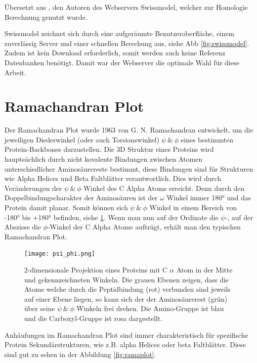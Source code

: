 Übersetzt aus \cite{Biasini.2014}, den Autoren des Webservers Swissmodel, welcher zur Homologie Berechnung genutzt wurde. 

Swissmodel zeichnet sich durch eine aufgeräumte Benutzeroberfläche, einem zuverlässig Server und einer schnellen Berechung aus, siehe \ac{Abb} \ref{fig:swissmodel}. Zudem ist kein Download erforderlich, somit werden auch keine Referenz Datenbanken benötigt. Damit war der Webserver die optimale Wahl für diese Arbeit.



\section{Ramachandran Plot}

Der Ramachandran Plot wurde 1963 von G. N. Ramachandran \cite{RAMACHANDRAN.1963} entwickelt, um die jeweiligen Diederwinkel (oder auch Torsionswinkel)  $\psi\ \&\ \phi$ eines bestimmten Protein-Backbones darzustellen. Die 3D Struktur eines Proteins wird hauptsächlich durch nicht kovalente Bindungen zwischen Atomen unterschiedlicher Aminosäurereste bestimmt, diese Bindungen sind für Strukturen wie Alpha Helices und Beta Faltblätter verantwortlich. Dies wird durch Veränderungen der  $\psi\ \&\ \phi$ Winkel des C Alpha Atoms erreicht. Denn durch den Doppelbindungscharakter der Aminosäuren ist der $\omega$ Winkel immer 180° und das Protein damit planar. Somit können sich $\psi\ \&\ \phi$ Winkel in einem Bereich von -180° bis +180° befinden, siehe \ref{fig:psi_phi}. Wenn man nun auf der Ordinate die $\psi$-, auf der Abszisse die $\phi$-Winkel der C Alpha Atome aufträgt, erhält man den typischen Ramachandran Plot. 

\begin{figure}
    \texttt{[image: psi\_phi.png]}
    \caption{2-dimensionale Projektion eines Proteins mit C $\alpha$ Atom in der Mitte und gekennzeichneten Winkeln. Die grauen Ebenen zeigen, dass die Atome welche durch die Peptidbindung (rot) verbunden sind jeweils auf einer Ebene liegen, so kann sich der der Aminosäurerest (grün) über seine $\psi\ \&\ \phi$ Winkeln frei drehen. Die Amino-Gruppe ist blau und die Carboxyl-Gruppe ist rosa dargestellt.\protect\footnotemark}
    \label{fig:psi_phi}
\end{figure}

Anhäufungen im Ramachandran Plot sind immer charakteristisch für spezifische Protein Sekundärstrukturen, wie z.B. alpha Helices oder beta Faltblätter. Diese sind gut zu sehen in der Abbildung \ref{fig:ramaplot}.

